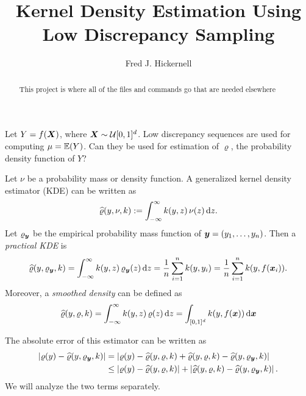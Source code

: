 \documentclass{amsart}
\newcommand{\hvarrho}{\widehat{\varrho}}
\begin{document}
\title{Kernel Density Estimation Using Low Discrepancy Sampling}
\author{Fred J. Hickernell}
\begin{abstract}This project is where all of the files and commands go that are needed elsewhere
\end{abstract}

\maketitle

Let $Y = f(\boldsymbol{X})$, where $\boldsymbol{X} \sim \mathcal{U}[0,1]^d$.  Low discrepancy sequences are used for computing  $\mu = \operatorname{\mathbb{E}}(Y)$.  Can they be used for estimation of $\varrho$, the probability density function of $Y$?

Let $\nu$ be a probability mass or density function.  A generalized kernel density estimator (KDE) can be written as
\[
\hvarrho(y,\nu,k) := \int_{-\infty}^{\infty} k(y,z) \, \nu(z) \, \dif z.
\]
Let $\varrho_{\boldsymbol{y}}$ be the empirical probability mass function of $\boldsymbol{y} = (y_1, \ldots, y_n)$.  Then a \emph{practical KDE} is 
\begin{equation*}
\hvarrho(y,\varrho_{\vy},k) = \int_{-\infty}^{\infty} k(y,z) \, \varrho_{\vy}(z) \, \dif z = \frac 1n \sum_{i=1}^n k(y,y_i) \\
 = \frac 1n \sum_{i=1}^n k(y,f(\vx_i)) .
\end{equation*}
Moreover, a \emph{smoothed density} can be defined as 
\[
\hvarrho(y,\varrho,k) = \int_{-\infty}^{\infty} k(y,z) \, \varrho(z) \, \dif z = \int_{[0,1]^d} k(y,f(\vx)) \,  \dif \vx  
\]

The absolute error of this estimator can be written as 
\begin{align*}
    \abs{\varrho(y) - \hvarrho(y,\varrho_{\vy},k)} & = 
     \abs{\varrho(y) - \hvarrho(y,\varrho,k) + \hvarrho(y,\varrho,k) - \hvarrho(y,\varrho_{\vy},k)} \\
     & \le  \abs{\varrho(y) - \hvarrho(y,\varrho,k)} + \abs{\hvarrho(y,\varrho,k) - \hvarrho(y,\varrho_{\vy},k)}.
\end{align*}
We will analyze the two terms separately.
\end{document}
